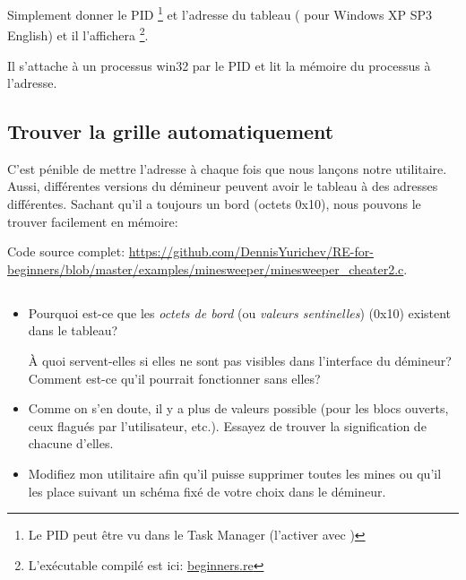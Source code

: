 

Simplement donner le \ac{PID}
\footnote{Le PID peut être vu dans le Task Manager
(l'activer avec )}
et l'adresse du tableau ( pour Windows XP SP3 English)
et il l'affichera
\footnote{L'exécutable compilé est ici:
\href{http://go.yurichev.com/17165}{beginners.re}}.

Il s'attache à un processus win32 par le \ac{PID} et lit la mémoire du processus
à l'adresse.

\subsection{Trouver la grille automatiquement}

C'est pénible de mettre l'adresse à chaque fois que nous lançons notre utilitaire.
Aussi, différentes versions du démineur peuvent avoir le tableau à des adresses différentes.
Sachant qu'il a toujours un bord (octets 0x10), nous pouvons le trouver facilement
en mémoire:



Code source complet: \url{https://github.com/DennisYurichev/RE-for-beginners/blob/master/examples/minesweeper/minesweeper_cheater2.c}.

\subsection{\Exercises}

\begin{itemize}

\item 
Pourquoi est-ce que les \emph{octets de bord} (ou \emph{valeurs sentinelles}) (0x10)
existent dans le tableau?

À quoi servent-elles si elles ne sont pas visibles dans l'interface du démineur?
Comment est-ce qu'il pourrait fonctionner sans elles?

\item 
Comme on s'en doute, il y a plus de valeurs possible (pour les blocs ouverts, ceux
flagués par l'utilisateur, etc.).
Essayez de trouver la signification de chacune d'elles.

\item 
Modifiez mon utilitaire afin qu'il puisse supprimer toutes les mines ou qu'il les
place suivant un schéma fixé de votre choix dans le démineur.

\end{itemize}
